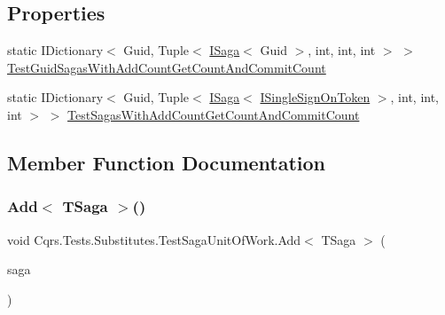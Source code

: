 \subsection*{Properties}
\begin{DoxyCompactItemize}
\item 
static I\+Dictionary$<$ Guid, Tuple$<$ \hyperlink{interfaceCqrs_1_1Domain_1_1ISaga}{I\+Saga}$<$ Guid $>$, int, int, int $>$ $>$ \hyperlink{classCqrs_1_1Tests_1_1Substitutes_1_1TestSagaUnitOfWork_ac917d6c520ef42fb92a56a7505b98302_ac917d6c520ef42fb92a56a7505b98302}{Test\+Guid\+Sagas\+With\+Add\+Count\+Get\+Count\+And\+Commit\+Count}
\item 
static I\+Dictionary$<$ Guid, Tuple$<$ \hyperlink{interfaceCqrs_1_1Domain_1_1ISaga}{I\+Saga}$<$ \hyperlink{interfaceCqrs_1_1Authentication_1_1ISingleSignOnToken}{I\+Single\+Sign\+On\+Token} $>$, int, int, int $>$ $>$ \hyperlink{classCqrs_1_1Tests_1_1Substitutes_1_1TestSagaUnitOfWork_a159f0f56913792373a9270e888caaa97_a159f0f56913792373a9270e888caaa97}{Test\+Sagas\+With\+Add\+Count\+Get\+Count\+And\+Commit\+Count}
\end{DoxyCompactItemize}


\subsection{Member Function Documentation}
\mbox{\label{classCqrs_1_1Tests_1_1Substitutes_1_1TestSagaUnitOfWork_a9469938dc87569d5fa29aea5c97e610f_a9469938dc87569d5fa29aea5c97e610f}} 
\subsubsection{\texorpdfstring{Add$<$ T\+Saga $>$()}{Add< TSaga >()}}
{\footnotesize\ttfamily void Cqrs.\+Tests.\+Substitutes.\+Test\+Saga\+Unit\+Of\+Work.\+Add$<$ T\+Saga $>$ (\begin{DoxyParamCaption}\item[{T\+Saga}]{saga }\end{DoxyParamCaption})}



